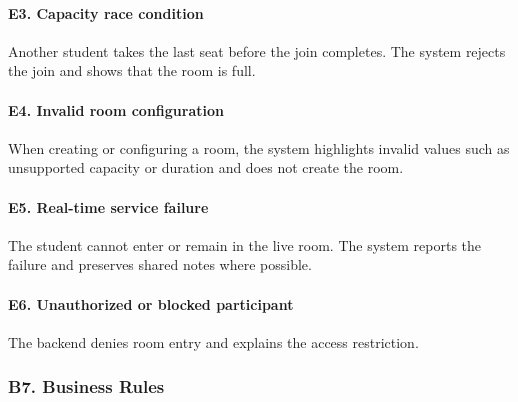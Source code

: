 \documentclass[12pt]{article}
\begin{document}
\paragraph*{E3. Capacity race condition}
\par\medskip

Another student takes the last seat before the join completes. The system rejects the join and shows that the room is full.
\par\medskip

\hypertarget{sec:e4-invalid-room-configuration}{}
\paragraph*{E4. Invalid room configuration}
\par\medskip

When creating or configuring a room, the system highlights invalid values such as unsupported capacity or duration and does not create the room.
\par\medskip

\hypertarget{sec:e5-real-time-service-failure}{}
\paragraph*{E5. Real-time service failure}
\par\medskip

The student cannot enter or remain in the live room. The system reports the failure and preserves shared notes where possible.
\par\medskip

\hypertarget{sec:e6-unauthorized-or-blocked-participant}{}
\paragraph*{E6. Unauthorized or blocked participant}
\par\medskip

The backend denies room entry and explains the access restriction.
\par\medskip

\hypertarget{sec:b7-business-rules}{}
\subsubsection*{B7. Business Rules}
\par\medskip
\end{document}
